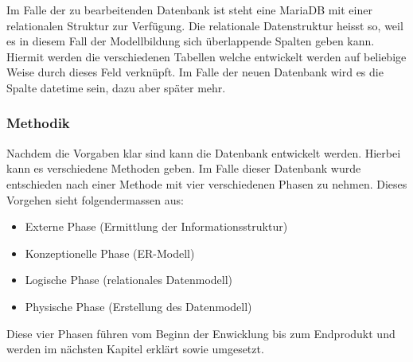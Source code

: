 Im Falle der zu bearbeitenden Datenbank ist steht eine MariaDB mit einer relationalen Struktur zur Verfügung. Die relationale Datenstruktur heisst so, weil es in diesem Fall der Modellbildung sich überlappende Spalten geben kann.\cite{IntroductionToRelationalDatabases:MariaDB} Hiermit werden die verschiedenen Tabellen welche entwickelt werden auf beliebige Weise durch dieses Feld verknüpft. Im Falle der neuen Datenbank wird es die Spalte datetime sein, dazu aber später mehr.\\

\subsubsection{Methodik}
Nachdem die Vorgaben klar sind kann die Datenbank entwickelt werden. Hierbei kann es verschiedene Methoden geben. Im Falle dieser Datenbank wurde entschieden nach einer Methode mit vier verschiedenen Phasen zu nehmen. \cite{Datenbanken:GrundlagenUndEntwurf:VeikkoKrypczyk} Dieses Vorgehen sieht folgendermassen aus:
\begin{itemize}
\item Externe Phase (Ermittlung der Informationsstruktur)
\item Konzeptionelle Phase (ER-Modell)
\item Logische Phase (relationales Datenmodell)
\item Physische Phase (Erstellung des Datenmodell)
\end{itemize}

Diese vier Phasen führen vom Beginn der Enwicklung bis zum Endprodukt und werden im nächsten Kapitel erklärt sowie umgesetzt.

